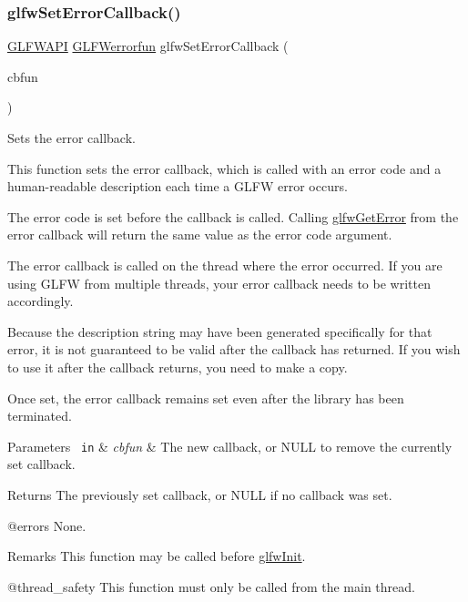 \subsubsection{\texorpdfstring{glfwSetErrorCallback()}{glfwSetErrorCallback()}}
{\footnotesize\ttfamily \mbox{\hyperlink{glfw3_8h_a56da5036b2cc259351ae22fd6439bb47}{G\+L\+F\+W\+A\+PI}} \mbox{\hyperlink{group__init_ga6b8a2639706d5c409fc1287e8f55e928}{G\+L\+F\+Werrorfun}} glfw\+Set\+Error\+Callback (\begin{DoxyParamCaption}\item[{\mbox{\hyperlink{group__init_ga6b8a2639706d5c409fc1287e8f55e928}{G\+L\+F\+Werrorfun}}}]{cbfun }\end{DoxyParamCaption})}



Sets the error callback. 

This function sets the error callback, which is called with an error code and a human-\/readable description each time a G\+L\+FW error occurs.

The error code is set before the callback is called. Calling \mbox{\hyperlink{group__init_gaee7bac4c7e1b2769207747c1b5ae2f9e}{glfw\+Get\+Error}} from the error callback will return the same value as the error code argument.

The error callback is called on the thread where the error occurred. If you are using G\+L\+FW from multiple threads, your error callback needs to be written accordingly.

Because the description string may have been generated specifically for that error, it is not guaranteed to be valid after the callback has returned. If you wish to use it after the callback returns, you need to make a copy.

Once set, the error callback remains set even after the library has been terminated.


\begin{DoxyParams}[1]{Parameters}
\mbox{\texttt{ in}}  & {\em cbfun} & The new callback, or {\ttfamily N\+U\+LL} to remove the currently set callback. \\
\hline
\end{DoxyParams}
\begin{DoxyReturn}{Returns}
The previously set callback, or {\ttfamily N\+U\+LL} if no callback was set.
\end{DoxyReturn}
@errors None.

\begin{DoxyRemark}{Remarks}
This function may be called before \mbox{\hyperlink{group__init_gab41771f0215a2e0afb4cf1cf98082d40}{glfw\+Init}}.
\end{DoxyRemark}
@thread\+\_\+safety This function must only be called from the main thread.

